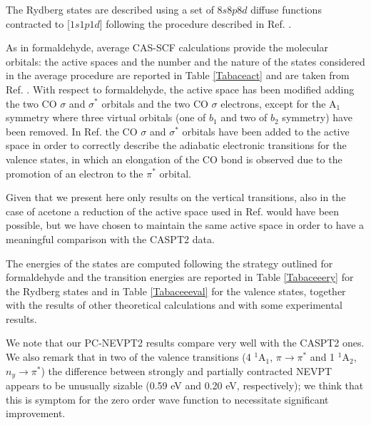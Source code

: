 \documentclass[global,referee]{svjour}
\begin{document}
The Rydberg states are described using a set of $8s8p8d$ diffuse functions \cite{Kaufm89}
contracted to [$1s1p1d$] following the procedure described in Ref. \cite{Roos95}.


As in formaldehyde, average CAS-SCF calculations provide the molecular orbitals: 
the active spaces and the number and the nature of the states 
considered in the average procedure are reported in Table \ref{Tabaceact}
and are taken from Ref. \cite{Merch96}.
With respect to formaldehyde, the active space has been 
modified adding the two CO $\sigma$ and $\sigma^*$ orbitals and the two CO $\sigma$ electrons, except
for the A$_1$ symmetry where three virtual orbitals (one of $b_1$ and two of $b_2$ symmetry)
have been removed. In Ref. \cite{Merch96} the  CO $\sigma$ and $\sigma^*$ orbitals have been
added to the active space in order to correctly describe the adiabatic electronic transitions 
for the valence states, in which an elongation of the CO bond is observed 
due to the promotion of an electron to the $\pi^*$ orbital.

Given that we present here only results on the vertical transitions, also in the case
of acetone a reduction of the active space used in Ref. \cite{Merch96} would have been 
possible, but we have chosen to maintain the same active space in order to have a
meaningful comparison with the CASPT2 data.

The energies of the states are computed following the strategy outlined for formaldehyde
and the transition energies are reported in Table \ref{Tabaceeery} 
for the Rydberg states and in Table
\ref{Tabaceeeval} for the valence states, 
together with the results of other theoretical calculations and with some experimental results.


We note that our PC-NEVPT2 results compare very well with the CASPT2 ones.
We also remark that in two of the valence transitions (4 $^1$A$_1$, $\pi\rightarrow\pi^*$ and
1 $^1$A$_2$, $n_y\rightarrow\pi^*$) the difference between strongly and partially contracted 
NEVPT appears to be unusually sizable (0.59 eV and 0.20 eV, respectively); 
we think that this is symptom for the zero order wave function to necessitate significant improvement.
\end{document}
